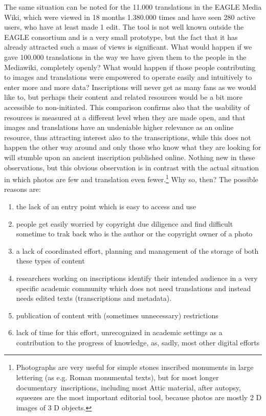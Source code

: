 \documentclass[amsthm,ebook]{saparticle}
\begin{document}
The same situation can be noted for the 11.000 translations in the EAGLE Media Wiki, which were viewed in 18 months 1.380.000 times and have seen 280 active users, who have at least made 1 edit. The tool is not well known outside the EAGLE consortium and is a very small prototype, but the fact that it has already attracted such a mass of views is significant. What would happen if we gave 100.000 translations in the way we have given them to the people in the Mediawiki, completely openly? What would happen if those people contributing to images and translations were empowered to operate easily and intuitively to enter more and more data? Inscriptions will never get as many fans as we would like to, but perhaps their content and related resources would be a bit more accessible to non-initiated. 
This comparison confirms also that the usability of resources is measured at a different level when they are made open, and that images and translations have an undeniable higher relevance as an online resource, thus attracting interest also to the transcriptions, while this does not happen the other way around and only those who know what they are looking for will stumble upon an ancient inscription published online. Nothing new in these observations, but this obvious observation is in contrast with the actual situation in which photos are few and translation even fewer.\footnote{Photographs are very useful  for simple stones inscribed monuments in large lettering (as e.g. Roman monumental texts), but for most longer documentary inscriptions, including most Attic material, after autopsy, squeezes are the most important editorial tool, because photos are mostly 2 D images of 3 D objects.} Why so, then? The possible reasons are:
\begin{enumerate}
\item the lack of an entry point which is easy to access and use
\item people get easily worried by copyright due diligence and find difficult sometime to trak back who is the author or the copyright owner of a photo
\item a lack of coordinated effort, planning and management of the storage of both these types of content
\item researchers working on inscriptions identify their intended audience in a very specific academic community which does not need translations and instead needs edited texts (transcriptions and metadata). 
\item publication of content with (sometimes unnecessary) restrictions
\item lack of time for this effort, unrecognized in academic settings as a contribution to the progress of knowledge, as, sadly, most other digital efforts
\end{enumerate}
\end{document}
